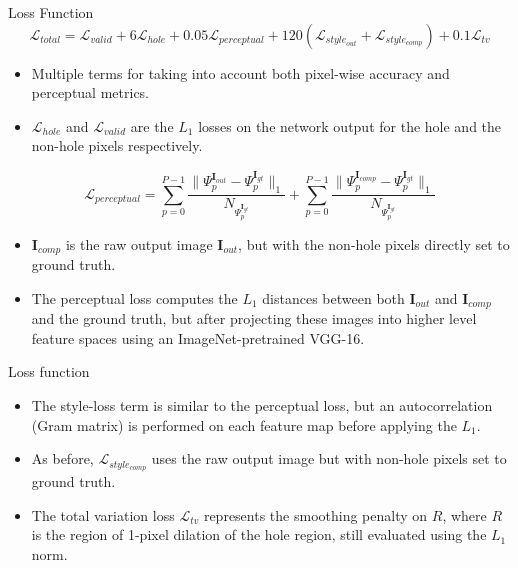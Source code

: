 \documentclass[aspectratio=43]{beamer}
\begin{document}
	
	\begin{frame}{Loss Function}
		\centering
		\begin{equation*}
				\mathcal{L}_{total} = 
				\mathcal{L}_{valid} + 6\mathcal{L}_{hole} + 0.05\mathcal{L}_{perceptual}
				+ 120(\mathcal{L}_{style_{out}} + \mathcal{L}_{style_{comp}}) + 0.1\mathcal{L}_{tv}
		\end{equation*}
		\begin{itemize}
			\item Multiple terms for taking into account both pixel-wise accuracy and perceptual metrics.
			\item $\mathcal{L}_{hole}$ and $\mathcal{L}_{valid}$ are the $L_1$ losses on the network output for the hole and the non-hole pixels respectively.
		\end{itemize}
		\begin{equation*}
			\mathcal{L}_{perceptual} = \sum_{p=0}^{P-1} \frac{\| \Psi_{p}^{\mathbf{I}_{out}} - \Psi_{p}^{\mathbf{I}_{gt}} \|_1}{N_{\Psi_{p}^{\mathbf{I}_{gt}}}}
			+ \sum_{p=0}^{P-1} \frac{\|  \Psi_{p}^{\mathbf{I}_{comp}} - \Psi_{p}^{\mathbf{I}_{gt}} \|_1}{N_{\Psi_{p}^{\mathbf{I}_{gt}}}}
		\end{equation*}
		\begin{itemize}
			\item $\mathbf{I}_{comp}$ is the raw output image $\mathbf{I}_{out}$, but with the non-hole pixels directly set to ground truth.
			\item The perceptual loss computes the $L_1$ distances between both $\mathbf{I}_{out}$ and $\mathbf{I}_{comp}$ and the ground truth, but after projecting these images into higher level feature spaces using an ImageNet-pretrained VGG-16.
		\end{itemize}
	\end{frame}
	
	
	\begin{frame}{Loss function}
		\centering
		\begin{itemize}
			\item The style-loss term is similar to the perceptual loss, but an autocorrelation (Gram matrix) is performed on each feature map before applying the $L_1$.
			\item As before, $\mathcal{L}_{style_{comp}}$ uses the raw output image but with non-hole pixels set to ground truth.
			\item The total variation loss $\mathcal{L}_{tv}$ represents the smoothing penalty on $R$, where $R$ is the region of 1-pixel dilation of the hole region, still evaluated using the $L_1$ norm.
		\end{itemize}
	\end{frame}
	
\end{document}
